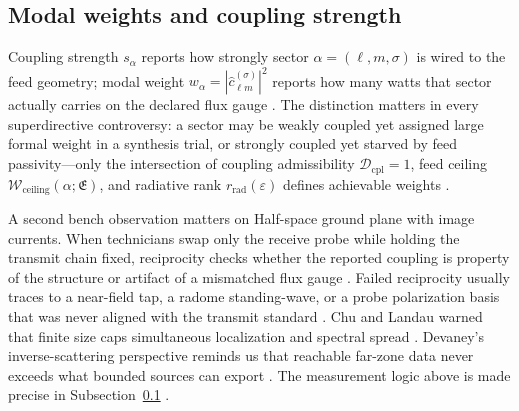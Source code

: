 \subsection{Modal weights and coupling strength}
\label{sec:ch454}
Coupling strength $s_\alpha$ reports how strongly sector $\alpha=(\ell,m,\sigma)$ is wired to the feed geometry; modal weight $w_\alpha=|\widehat{c}_{\ell m}^{(\sigma)}|^2$ reports how many watts that sector actually carries on the declared flux gauge \cite{stratton1941}. The distinction matters in every superdirective controversy: a sector may be weakly coupled yet assigned large formal weight in a synthesis trial, or strongly coupled yet starved by feed passivity---only the intersection of coupling admissibility $\mathcal{D}_{\mathrm{cpl}}=1$, feed ceiling $\mathcal{W}_{\mathrm{ceiling}}(\alpha;\mathfrak{E})$, and radiative rank $r_{\mathrm{rad}}(\varepsilon)$ defines achievable weights \cite{harrington2001}.
\begin{physicalvignette}
A second bench observation matters on Half-space ground plane with image currents. When technicians swap only the receive probe while holding the transmit chain fixed, reciprocity checks whether the reported coupling is property of the structure or artifact of a mismatched flux gauge \cite{stratton1941}. Failed reciprocity usually traces to a near-field tap, a radome standing-wave, or a probe polarization basis that was never aligned with the transmit standard \cite{hansen1988}.
Chu and Landau warned that finite size caps simultaneous localization and spectral spread \cite{chu1948}. Devaney's inverse-scattering perspective reminds us that reachable far-zone data never exceeds what bounded sources can export \cite{devaney2004}.
The measurement logic above is made precise in Subsection~\ref{sec:ch454} \cite{stratton1941}.
\end{physicalvignette}
